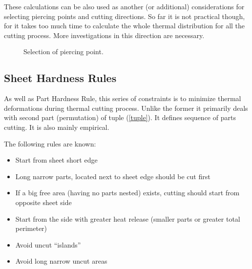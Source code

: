 \documentclass{../download/tPRS2e}
\begin{document}
These calculations can be also used as another (or additional) considerations for selecting piercing points and cutting directions.
So far it is not practical though, for it takes too much time to calculate the whole thermal distribution for all the cutting process.
More investigations in this direction are necessary.

\begin{figure}
\begin{center}
\caption{Selection of piercing point.}\label{thermals}
\end{center}
\end{figure}

\subsection{Sheet Hardness Rules}

As well as Part Hardness Rule, this series of constraints is to minimize thermal deformations during thermal cutting process.
Unlike the former it primarily deals with second part (permutation) of tuple (\ref{tuple}).
It defines sequence of parts cutting. It is also mainly empirical.

The following rules are known:

\begin{itemize}
\item Start from sheet short edge
\item Long narrow parts, located next to sheet edge should be cut first
\item If a big free area (having no parts nested) exists, cutting should start from opposite sheet side
\item Start from the side with greater heat release (smaller parts or greater total perimeter)
\item Avoid uncut ``islands''
\item Avoid long narrow uncut areas
\end{itemize}
\end{document}
